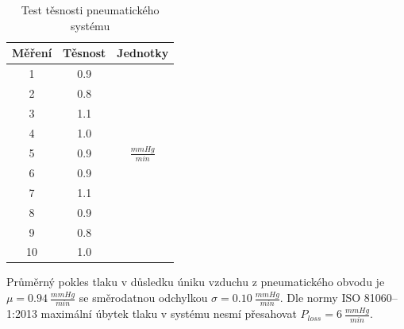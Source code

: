 \begin{table}[H]
    \label{tab:pressure_test_pneu}
    \caption{Test těsnosti pneumatického systému}
    \begin{ctucolortab}
        \begin{tabular}{ccc}
            \toprule
            Měření & Těsnost & Jednotky           \\ \midrule
            1      & 0.9     &                    \\
            2      & 0.8     &                    \\
            3      & 1.1     &                    \\
            4      & 1.0     &                    \\
            5      & 0.9     & $\frac{mmHg}{min}$ \\
            6      & 0.9     &                    \\
            7      & 1.1     &                    \\
            8      & 0.9     &                    \\
            9      & 0.8     &                    \\
            10     & 1.0     &                    \\
            \bottomrule
        \end{tabular}
    \end{ctucolortab}
\end{table}
Průměrný pokles tlaku v důsledku úniku vzduchu z pneumatického obvodu je $\mu = 0.94 \ \frac{mmHg}{min}$ se směrodatnou odchylkou $\sigma = 0.10  \ \frac{mmHg}{min}$.
Dle normy ISO 81060–1:2013 maximální úbytek tlaku v systému nesmí přesahovat $P_{loss} = 6 \ \frac{mmHg}{min}$.
\pagebreak
